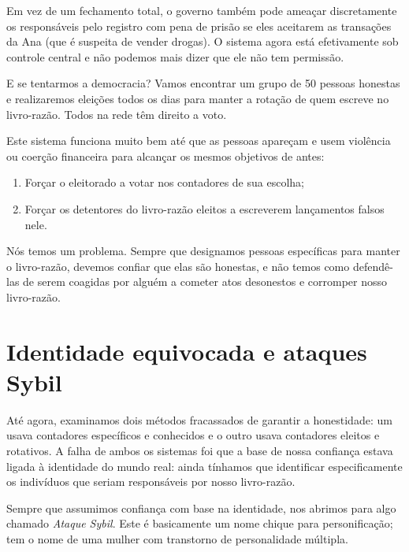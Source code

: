 Em vez de um fechamento total, o governo também pode ameaçar discretamente os responsáveis pelo registro com pena de prisão se eles aceitarem as transações da Ana (que é suspeita de vender drogas). O sistema agora está efetivamente sob controle central e não podemos mais dizer que ele não tem permissão.

E se tentarmos a democracia? Vamos encontrar um grupo de 50 pessoas honestas e realizaremos eleições todos os dias para manter a rotação de quem escreve no livro-razão. Todos na rede têm direito a voto.

Este sistema funciona muito bem até que as pessoas apareçam e usem violência ou coerção financeira para alcançar os mesmos objetivos de antes:

\begin{samepage}
\begin{enumerate}
\item Forçar o eleitorado a votar nos contadores de sua escolha;
\item Forçar os detentores do livro-razão eleitos a escreverem lançamentos falsos nele.
\end{enumerate}
\end{samepage}

Nós temos um problema. Sempre que designamos pessoas específicas para manter o livro-razão, devemos confiar que elas são honestas, e não temos como defendê-las de serem coagidas por alguém a cometer atos desonestos e corromper nosso livro-razão.

\section*{Identidade equivocada e ataques Sybil}
Até agora, examinamos dois métodos fracassados de garantir a honestidade: um usava contadores específicos e conhecidos e o outro usava contadores eleitos e rotativos. A falha de ambos os sistemas foi que a base de nossa confiança estava ligada à identidade do mundo real: ainda tínhamos que identificar especificamente os indivíduos que seriam responsáveis por nosso livro-razão.

Sempre que assumimos confiança com base na identidade, nos abrimos para algo chamado \textit{Ataque Sybil}. Este é basicamente um nome chique para personificação; tem o nome de uma mulher com transtorno de personalidade múltipla.

